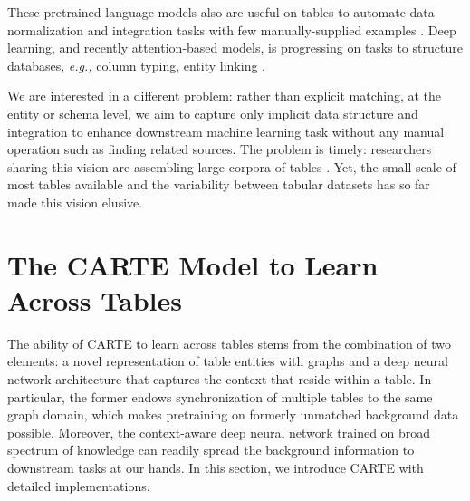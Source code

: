 \documentclass{article}
\theoremstyle{plain}
\theoremstyle{definition}
\theoremstyle{remark}
\begin{document}
These pretrained language models also are useful on tables to automate data normalization and integration tasks with few manually-supplied examples \citep{narayan2022can}. Deep learning, and recently attention-based models, is progressing on tasks to structure databases, \emph{e.g.,} column typing, entity linking \citep{hulsebos2019sherlock,dengTURLTableUnderstanding2020}.

\bigskip%
\vfill

We are interested in a different problem: rather than explicit matching, at the entity or schema level, we aim to capture only implicit data structure and integration to enhance downstream machine learning task without any manual operation such as finding related sources. 
The problem is timely: researchers sharing this vision are assembling large corpora of tables \citep{hulsebosGitTablesLargeScaleCorpus2023,eggertTabLibDataset627M2023}. Yet, the small scale of most tables available and the variability between tabular datasets has so far made this vision elusive. 


\section{The CARTE Model to Learn Across Tables}\label{sec:carte}
The ability of CARTE to learn across tables stems from the combination of two elements: a novel representation of table entities with graphs and a deep neural network architecture that captures the context that reside within a table. In particular, the former endows synchronization of multiple tables to the same graph domain, which makes pretraining on formerly unmatched background data possible. Moreover, the context-aware deep neural network trained on broad spectrum of knowledge can readily spread the background information to downstream tasks at our hands. In this section, we introduce CARTE with detailed implementations. 
\end{document}
